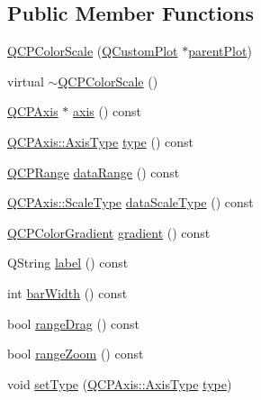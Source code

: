 \subsection*{Public Member Functions}
\begin{DoxyCompactItemize}
\item 
\hyperlink{class_q_c_p_color_scale_aa8debce1be38b54287c04d4f584394b4}{Q\+C\+P\+Color\+Scale} (\hyperlink{class_q_custom_plot}{Q\+Custom\+Plot} $\ast$\hyperlink{class_q_c_p_layerable_ab7e0e94461566093d36ffc0f5312b109}{parent\+Plot})
\item 
virtual \hyperlink{class_q_c_p_color_scale_a49d8d2d155c15fa315fdc0427194c9ea}{$\sim$\+Q\+C\+P\+Color\+Scale} ()
\item 
\hyperlink{class_q_c_p_axis}{Q\+C\+P\+Axis} $\ast$ \hyperlink{class_q_c_p_color_scale_a1205bd67c8a33d5818aac1f6eea016a4}{axis} () const 
\item 
\hyperlink{class_q_c_p_axis_ae2bcc1728b382f10f064612b368bc18a}{Q\+C\+P\+Axis\+::\+Axis\+Type} \hyperlink{class_q_c_p_color_scale_a9a5236328c97fbfde01e3d91c4fcce6a}{type} () const 
\item 
\hyperlink{class_q_c_p_range}{Q\+C\+P\+Range} \hyperlink{class_q_c_p_color_scale_a52134696d5e04074fff4227d92d96f7b}{data\+Range} () const 
\item 
\hyperlink{class_q_c_p_axis_a36d8e8658dbaa179bf2aeb973db2d6f0}{Q\+C\+P\+Axis\+::\+Scale\+Type} \hyperlink{class_q_c_p_color_scale_a9718c004421811be97e683d7f7d7ee61}{data\+Scale\+Type} () const 
\item 
\hyperlink{class_q_c_p_color_gradient}{Q\+C\+P\+Color\+Gradient} \hyperlink{class_q_c_p_color_scale_ac71a6cd853c97a2dbfd32f67afd399df}{gradient} () const 
\item 
Q\+String \hyperlink{class_q_c_p_color_scale_af92a62a6e4401f4c5b5e36cc94351ec9}{label} () const 
\item 
int \hyperlink{class_q_c_p_color_scale_a0de546f12105cf8bcb00ce60366d3a3d}{bar\+Width} () const 
\item 
bool \hyperlink{class_q_c_p_color_scale_a0d45597064cc40bc8a84d11e870c6b05}{range\+Drag} () const 
\item 
bool \hyperlink{class_q_c_p_color_scale_a1123986a10acda3cdc371e4d97b3326c}{range\+Zoom} () const 
\item 
void \hyperlink{class_q_c_p_color_scale_a1bf9bdb291927c422dd66b404b206f1f}{set\+Type} (\hyperlink{class_q_c_p_axis_ae2bcc1728b382f10f064612b368bc18a}{Q\+C\+P\+Axis\+::\+Axis\+Type} \hyperlink{class_q_c_p_color_scale_a9a5236328c97fbfde01e3d91c4fcce6a}{type})

\end{DoxyCompactItemize}
